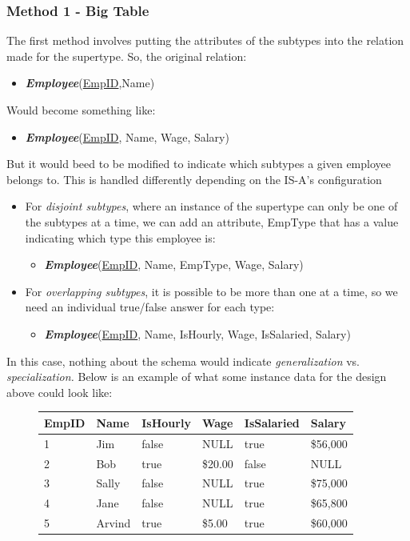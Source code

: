 \documentclass{report}
\begin{document}
\subsubsection*{Method 1 - Big Table}
The first method involves putting the attributes of the subtypes into the relation made for the supertype. So, the original relation:
\begin{itemize}
    \item \textit{\textbf{Employee}}(\underline{EmpID},Name)
\end{itemize}
Would become something like:
\begin{itemize}
    \item \textit{\textbf{Employee}}(\underline{EmpID}, Name, Wage, Salary)
\end{itemize}
But it would beed to be modified to indicate which subtypes a given employee belongs to. This is handled differently depending on the IS-A's configuration
\begin{itemize}
    \item For \textit{disjoint subtypes}, where an instance of the supertype can only be one of the subtypes at a time, we can add an attribute, EmpType that has a value indicating which type this employee is:
        \begin{itemize}
            \item \textit{\textbf{Employee}}(\underline{EmpID}, Name, EmpType, Wage, Salary)
        \end{itemize}
\end{itemize}
\begin{itemize}
    \item For \textit{overlapping subtypes}, it is possible to be more than one at a time, so we need an individual true/false answer for each type:
        \begin{itemize}
            \item \textit{\textbf{Employee}}(\underline{EmpID}, Name, IsHourly, Wage, IsSalaried, Salary)
        \end{itemize}
\end{itemize}
In this case, nothing about the schema would indicate \textit{generalization} vs. \textit{specialization.}
\newpage
\noindent Below is an example of what some instance data for the design above could look like:
    \begin{figure}[H]
    \centering
     \setlength{\tabcolsep}{20}
    \begin{tabular}{llllll}
    \toprule 
    EmpID&Name&IsHourly&Wage&IsSalaried&Salary \\
    \midrule
    1& Jim& false& NULL & true & \$56,000\\
    2&Bob&true&\$20.00&false&NULL \\
    3&Sally&false&NULL&true&\$75,000 \\
    4&Jane&false&NULL&true&\$65,800\\
    5&Arvind&true&\$5.00&true&\$60,000\\
    \bottomrule
    \end{tabular}
    \end{figure}
\end{document}
